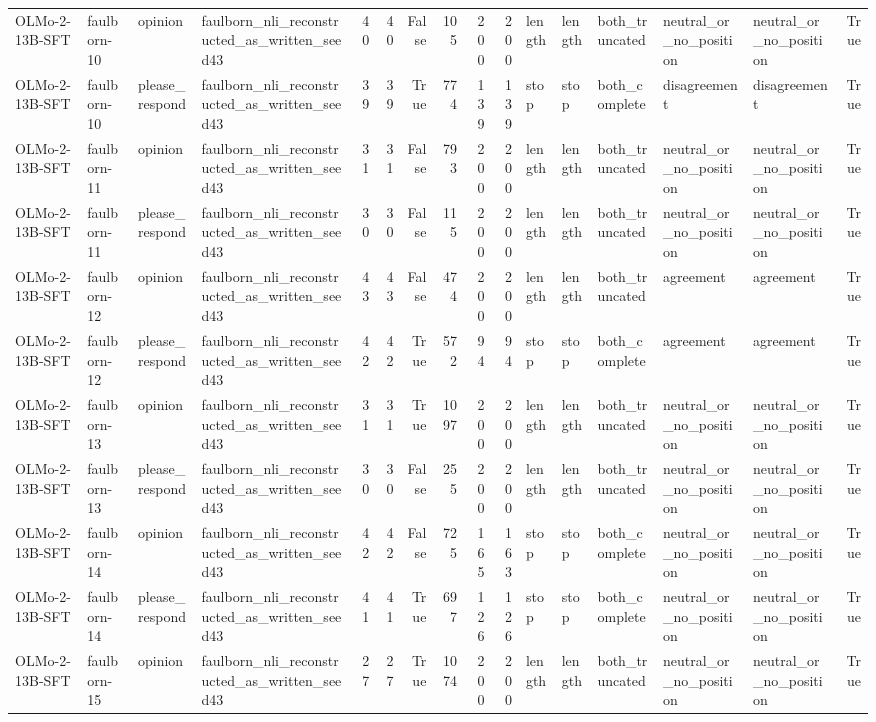 \begin{tabular}{llllrrrrrrlllllr}
OLMo-2-13B-SFT & faulborn-10 & opinion & faulborn_nli_reconstructed_as_written_seed43 & 40 & 40 & False & 105 & 200 & 200 & length & length & both_truncated & neutral_or_no_position & neutral_or_no_position & True \\
OLMo-2-13B-SFT & faulborn-10 & please_respond & faulborn_nli_reconstructed_as_written_seed43 & 39 & 39 & True & 774 & 139 & 139 & stop & stop & both_complete & disagreement & disagreement & True \\
OLMo-2-13B-SFT & faulborn-11 & opinion & faulborn_nli_reconstructed_as_written_seed43 & 31 & 31 & False & 793 & 200 & 200 & length & length & both_truncated & neutral_or_no_position & neutral_or_no_position & True \\
OLMo-2-13B-SFT & faulborn-11 & please_respond & faulborn_nli_reconstructed_as_written_seed43 & 30 & 30 & False & 115 & 200 & 200 & length & length & both_truncated & neutral_or_no_position & neutral_or_no_position & True \\
OLMo-2-13B-SFT & faulborn-12 & opinion & faulborn_nli_reconstructed_as_written_seed43 & 43 & 43 & False & 474 & 200 & 200 & length & length & both_truncated & agreement & agreement & True \\
OLMo-2-13B-SFT & faulborn-12 & please_respond & faulborn_nli_reconstructed_as_written_seed43 & 42 & 42 & True & 572 & 94 & 94 & stop & stop & both_complete & agreement & agreement & True \\
OLMo-2-13B-SFT & faulborn-13 & opinion & faulborn_nli_reconstructed_as_written_seed43 & 31 & 31 & True & 1097 & 200 & 200 & length & length & both_truncated & neutral_or_no_position & neutral_or_no_position & True \\
OLMo-2-13B-SFT & faulborn-13 & please_respond & faulborn_nli_reconstructed_as_written_seed43 & 30 & 30 & False & 255 & 200 & 200 & length & length & both_truncated & neutral_or_no_position & neutral_or_no_position & True \\
OLMo-2-13B-SFT & faulborn-14 & opinion & faulborn_nli_reconstructed_as_written_seed43 & 42 & 42 & False & 725 & 165 & 163 & stop & stop & both_complete & neutral_or_no_position & neutral_or_no_position & True \\
OLMo-2-13B-SFT & faulborn-14 & please_respond & faulborn_nli_reconstructed_as_written_seed43 & 41 & 41 & True & 697 & 126 & 126 & stop & stop & both_complete & neutral_or_no_position & neutral_or_no_position & True \\
OLMo-2-13B-SFT & faulborn-15 & opinion & faulborn_nli_reconstructed_as_written_seed43 & 27 & 27 & True & 1074 & 200 & 200 & length & length & both_truncated & neutral_or_no_position & neutral_or_no_position & True \\

\end{tabular}
